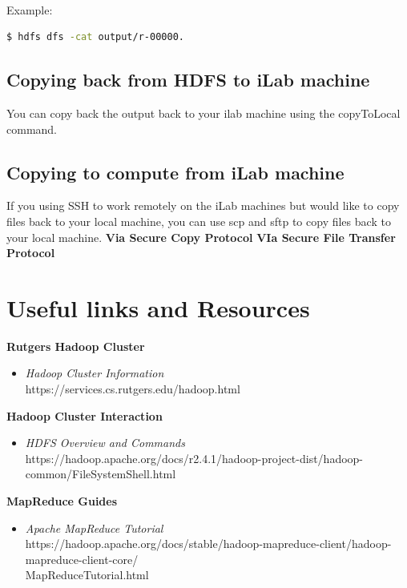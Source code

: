 \documentclass{article}
\begin{document}
\-\\\noindent Example:
\begin{lstlisting}[language=bash]
  $ hdfs dfs -cat output/r-00000.
\end{lstlisting}

\subsection{Copying back from HDFS to iLab machine}
You can copy back the output back to your ilab machine using the copyToLocal command. 

\subsection{Copying to compute from iLab machine}
If you using SSH to work remotely on the iLab machines but would like to copy files back to your local machine, you can use scp and sftp to copy files back to your local machine.
\textbf{Via Secure Copy Protocol}
\textbf{VIa Secure File Transfer Protocol}


\section*{Useful links and Resources}
\textbf{Rutgers Hadoop Cluster}
\begin{itemize}
    \item \textit{Hadoop Cluster Information}\\ https://services.cs.rutgers.edu/hadoop.html
\end{itemize}
\textbf{Hadoop Cluster Interaction}
\begin{itemize}
    \item \textit{HDFS Overview and Commands}\\ https://hadoop.apache.org/docs/r2.4.1/hadoop-project-dist/hadoop-common/FileSystemShell.html
\end{itemize}
\textbf{MapReduce Guides}
\begin{itemize}
    \item \textit{Apache MapReduce Tutorial}\\ https://hadoop.apache.org/docs/stable/hadoop-mapreduce-client/hadoop-mapreduce-client-core/\\MapReduceTutorial.html
\end{itemize} 
\end{document}
